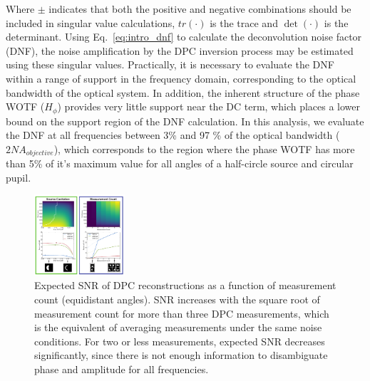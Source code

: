 Where $\pm$ indicates that both the positive and negative combinations should be included in singular value calculations, $tr(\cdot)$ is the trace and $\det(\cdot)$ is the determinant. Using Eq.~\ref{eq:intro_dnf} to calculate the deconvolution noise factor (DNF), the noise amplification by the DPC inversion process may be estimated using these singular values. Practically, it is necessary to evaluate the DNF within a range of support in the frequency domain, corresponding to the optical bandwidth of the optical system. In addition, the inherent structure of the phase WOTF ($H_{\phi}$) provides very little support near the DC term, which places a lower bound on the support region of the DNF calculation. In this analysis, we evaluate the DNF at all frequencies between 3\% and 97 \% of the optical bandwidth ($2NA_{objective}$), which corresponds to the region where the phase WOTF has more than 5\% of it's maximum value for all angles of a half-circle source and circular pupil.

\clearpage

\begin{figure}
  \label{fig:phase:dpc_measurement_count}
    \includegraphics[width=0.3\textwidth]{figures/fig_phase_dpc_optimization_meas.pdf}
  \caption{Expected SNR of DPC reconstructions as a function of measurement count (equidistant angles). SNR increases with the square root of measurement count for more than three DPC measurements, which is the equivalent of averaging measurements under the same noise conditions. For two or less measurements, expected SNR decreases significantly, since there is not enough information to disambiguate phase and amplitude for all frequencies.}
\end{figure}

